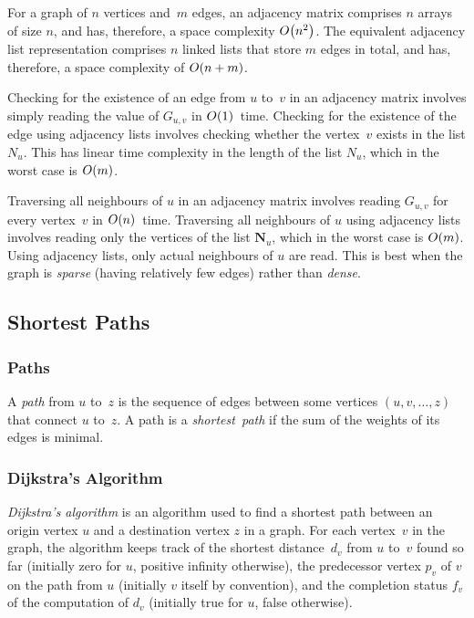 For a graph of \( n \) vertices and~\( m \) edges, an adjacency matrix comprises \( n \) arrays of size \( n \), and has, therefore, a space complexity \( O\!\left(n^{2}\right) \).
The equivalent adjacency list representation comprises \( n \) linked lists that store \( m \) edges in total, and has, therefore, a space complexity of \( O\!\left(n + m\right) \).

Checking for the existence of an edge from \( u \) to~\( v \) in an adjacency matrix involves simply reading the value of \( G_{u,v} \) in \( O\!\left(1\right) \)~time.
Checking for the existence of the edge using adjacency lists involves checking whether the vertex~\( v \) exists in the list \( N_{u} \).
This has linear time complexity in the length of the list \( N_{u} \), which in the worst case is \( O\!\left(m\right) \).

Traversing all neighbours of \( u \) in an adjacency matrix involves reading \( G_{u,v} \) for every vertex~\( v \) in \( O\!\left(n\right) \)~time.
Traversing all neighbours of \( u \) using adjacency lists involves reading only the vertices of the list \( \boldsymbol{N}_{u} \), which in the worst case is \( O\!\left(m\right) \).
Using adjacency lists, only actual neighbours of \( u \) are read.
This is best when the graph is \emph{sparse} (having relatively few edges) rather than \emph{dense}.

\subsection{Shortest Paths}

\subsubsection{Paths}

A \emph{path} from \( u \) to~\( z \) is the sequence of edges between some vertices \( \left( u, v, \ldots, z \right) \) that connect \( u \) to~\( z \).
A path is a \emph{shortest~path} if the sum of the weights of its edges is minimal.

\subsubsection{Dijkstra's Algorithm}

\emph{Dijkstra's algorithm} is an algorithm used to find a shortest path between an origin vertex \( u \) and a destination vertex \( z \) in a graph.
For each vertex~\( v \) in the graph, the algorithm keeps track of the shortest distance~\( d_{v} \) from \( u \) to~\( v \) found so far (initially zero for \( u \), positive infinity otherwise), the predecessor vertex \( p_{v} \) of \( v \) on the path from \( u \) (initially \( v \) itself by convention), and the completion status \( f_{v} \) of the computation of \( d_{v} \) (initially true for \( u \), false otherwise).


